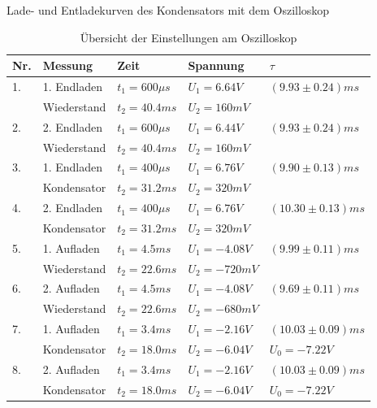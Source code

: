 \documentclass[twoside]{protokoll}
\begin{document}
\begin{aufgabe}{Lade- und Entladekurven des Kondensators mit dem Oszilloskop}
 
\begin{table}[H]
        \centering
        \begin{tabularx}{1.00\textwidth}{l X X X X}
            \toprule
            \textbf{Nr.} & \textbf{Messung} & \textbf{Zeit} & \textbf{Spannung} & $\tau$ \\
            \midrule
            1. & 1. Endladen & $t_1 = 600 \mu s$ & $U_1 = 6.64V$ & $(9.93 \pm 0.24)ms$\\
            & Wiederstand & $t_2 = 40.4 ms $  & $U_2 = 160mV$ & \\
            \midrule
            2. & 2. Endladen     & $t_1 = 600 \mu s$ & $U_1 = 6.44V$ & $(9.93 \pm 0.24)ms$ \\
            & Wiederstand  & $t_2 = 40.4 ms $  & $U_2 = 160mV$ \\
            \bottomrule
            3. & 1. Endladen     & $t_1 = 400 \mu s$ & $U_1 = 6.76V$ & $(9.90 \pm 0.13)ms$ \\
            & Kondensator  & $t_2 = 31.2 ms $  & $U_2 = 320mV$ \\
            \midrule
            4. & 2. Endladen     & $t_1 = 400 \mu s$ & $U_1 = 6.76V$ & $(10.30 \pm 0.13)ms$ \\
            & Kondensator  & $t_2 = 31.2 ms $  & $U_2 = 320mV$ \\
            \bottomrule
            5. & 1. Aufladen     & $t_1 = 4.5 ms  $ & $U_1 = -4.08V$ & $(9.99 \pm 0.11)ms$ \\
            & Wiederstand  & $t_2 = 22.6 ms $  & $U_2 = -720mV$ \\
            \midrule
            6. & 2. Aufladen     & $t_1 = 4.5 ms  $ & $U_1 = -4.08V$ & $(9.69 \pm 0.11)ms$ \\
            & Wiederstand  & $t_2 = 22.6 ms $  & $U_2 = -680mV$ \\
            \bottomrule
              7. & 1. Aufladen     & $t_1 = 3.4 ms  $ & $U_1 = -2.16V$ & $(10.03 \pm 0.09)ms$ \\
            & Kondensator  & $t_2 = 18.0 ms $  & $U_2 = -6.04V$ & $ U_0 = -7.22V$ \\
            \midrule
            8. & 2. Aufladen     & $t_1 = 3.4 ms  $ & $U_1 = -2.16V$ & $(10.03 \pm 0.09)ms$ \\
            & Kondensator  & $t_2 = 18.0 ms $  & $U_2 = -6.04V$ & $ U_0 = -7.22V$ \\
            \bottomrule
        \end{tabularx}
        \caption{Übersicht der Einstellungen am Oszilloskop}
        \label{tab:mytable}
    \end{table}
    


\end{aufgabe}
\end{document}
